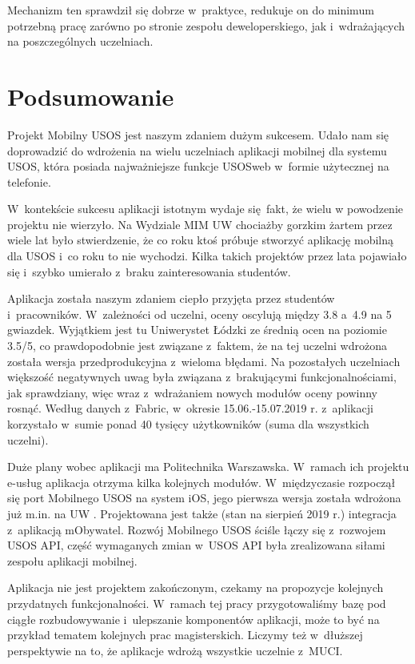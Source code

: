 \documentclass{pracamgr}
\begin{document}
Mechanizm ten sprawdził się dobrze w~praktyce, redukuje on do minimum potrzebną pracę
zarówno po stronie zespołu deweloperskiego, jak i~wdrażających na poszczególnych uczelniach.

\chapter{Podsumowanie}

Projekt Mobilny USOS jest naszym zdaniem dużym sukcesem. Udało nam się doprowadzić do
wdrożenia na wielu uczelniach aplikacji mobilnej dla systemu USOS, która posiada
najważniejsze funkcje USOSweb w~formie użytecznej na telefonie.

W~kontekście sukcesu aplikacji istotnym wydaje się fakt, że wielu w powodzenie 
projektu nie wierzyło. Na Wydziale MIM UW chociażby gorzkim żartem przez wiele
lat było stwierdzenie, że co roku ktoś próbuje stworzyć aplikację mobilną dla USOS
i~co roku to nie wychodzi. Kilka takich projektów przez lata pojawiało się i~szybko
umierało z~braku zainteresowania studentów. 

Aplikacja została naszym zdaniem ciepło przyjęta przez studentów i~pracowników.
W~zależności od uczelni, oceny oscylują między 3.8 a~4.9 na 5 gwiazdek.
Wyjątkiem jest tu Uniwerystet Łódzki ze średnią ocen na poziomie 3.5/5, co prawdopodobnie
jest związane z~faktem, że na tej uczelni wdrożona została wersja przedprodukcyjna z~wieloma
błędami. Na pozostałych uczelniach większość negatywnych uwag była związana z~brakującymi
funkcjonalnościami, jak sprawdziany, więc wraz z~wdrażaniem nowych modułów oceny powinny
rosnąć. Według danych z~Fabric, w~okresie 15.06.-15.07.2019 r. z~aplikacji korzystało w~sumie
ponad 40 tysięcy użytkowników (suma dla wszystkich uczelni).

Duże plany wobec aplikacji ma Politechnika Warszawska. W~ramach ich projektu e-usług
aplikacja otrzyma kilka kolejnych modułów. W~międzyczasie
rozpoczął się port Mobilnego USOS na system iOS, jego pierwsza wersja została wdrożona
już m.in. na UW \cite{appstore, uw-ios}. Projektowana jest także (stan na sierpień 2019 r.)
integracja z~aplikacją mObywatel. Rozwój Mobilnego USOS ściśle łączy się z~rozwojem USOS API,
część wymaganych zmian w~USOS API była zrealizowana siłami zespołu aplikacji mobilnej.

Aplikacja nie jest projektem zakończonym, czekamy na propozycje kolejnych przydatnych
funkcjonalności. W~ramach tej
pracy przygotowaliśmy bazę pod ciągłe rozbudowywanie i~ulepszanie komponentów aplikacji,
może to być na przykład tematem kolejnych prac magisterskich. Liczymy też w~dłuższej
perspektywie na to, że aplikacje wdrożą wszystkie uczelnie z~MUCI.
\end{document}
